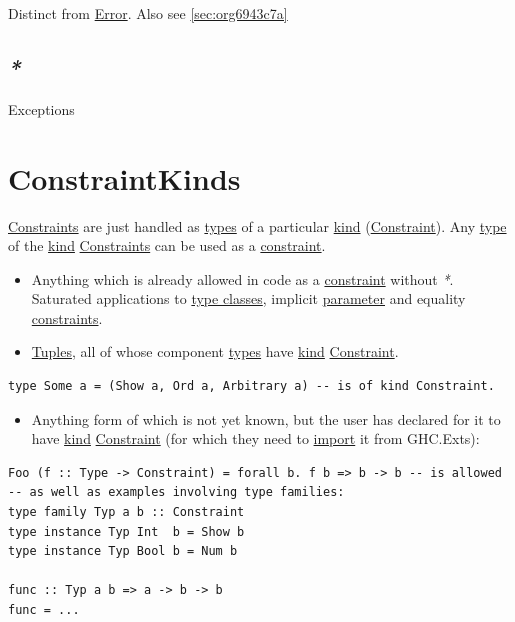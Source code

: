\documentclass[a4paper,14pt,oneside]{book}
\begin{document}
Distinct from \hyperref[orgc09ac90]{Error}. Also see \ref{sec:org6943c7a}

\section{\emph{*}}
\label{sec:orgfec0c80}

\label{org7a42c44}Exceptions

\chapter{\label{org89852f1}ConstraintKinds}
\label{sec:org0785f4b}
\hyperref[orgc1f6c1d]{Constraints} are just handled as \hyperref[org071cf6a]{types} of a particular \hyperref[org5dad8af]{kind} (\hyperref[orgc1c8fb4]{Constraint}).
Any \hyperref[org6e832de]{type} of the \hyperref[org5dad8af]{kind} \hyperref[orgc1f6c1d]{Constraints} can be used as a \hyperref[orgc1c8fb4]{constraint}.
\begin{itemize}
\item Anything which is already allowed in code as a \hyperref[orgc1c8fb4]{constraint} without \emph{*}. Saturated applications to \hyperref[org57c381e]{type classes}, implicit \hyperref[org022cfa5]{parameter} and equality \hyperref[orgc1f6c1d]{constraints}.
\item \hyperref[org940a812]{Tuples}, all of whose component \hyperref[org071cf6a]{types} have \hyperref[org5dad8af]{kind} \hyperref[orgc1c8fb4]{Constraint}.
\end{itemize}
\begin{verbatim}
type Some a = (Show a, Ord a, Arbitrary a) -- is of kind Constraint.
\end{verbatim}
\begin{itemize}
\item Anything form of which is not yet known, but the user has declared for it to have \hyperref[org5dad8af]{kind} \hyperref[orgc1c8fb4]{Constraint} (for which they need to \hyperref[org5b6b062]{import} it from GHC.Exts):
\end{itemize}
\begin{verbatim}
Foo (f :: Type -> Constraint) = forall b. f b => b -> b -- is allowed
-- as well as examples involving type families:
type family Typ a b :: Constraint
type instance Typ Int  b = Show b
type instance Typ Bool b = Num b

func :: Typ a b => a -> b -> b
func = ...
\end{verbatim}
\end{document}
